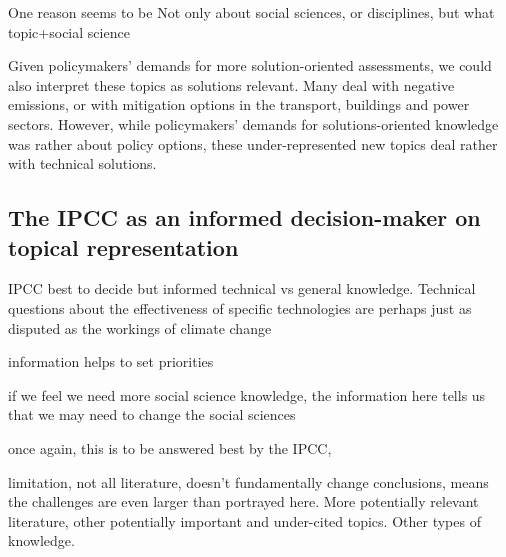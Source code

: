 \documentclass{article}
\begin{document}
\begin{linenumbers}
One reason seems to be
Not only about social sciences, or disciplines, but what topic+social science

Given policymakers' demands for more solution-oriented assessments, we could also interpret these topics as solutions relevant. Many deal with negative emissions, or with mitigation options in the transport, buildings and power sectors. However, while policymakers' demands for solutions-oriented knowledge was rather about policy options, these under-represented new topics deal rather with technical solutions.

\subsection*{The IPCC as an informed decision-maker on topical representation}

IPCC best to decide but informed
technical vs general knowledge.
Technical questions about the effectiveness of specific technologies are perhaps just as disputed as the workings of climate change


information helps to set priorities

if we feel we need more social science knowledge, the information here tells us that we may need to change the social sciences

once again, this is to be answered best by the IPCC, 

limitation, not all literature, doesn't fundamentally change conclusions, means the challenges are even larger than portrayed here. More potentially relevant literature, other potentially important and under-cited topics. Other types of knowledge.





\end{linenumbers}
\end{document}
